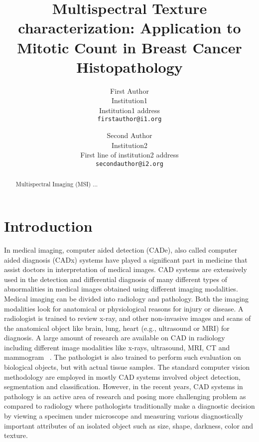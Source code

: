\documentclass[10pt,twocolumn,letterpaper]{article}
\begin{document}
\title{Multispectral Texture characterization: Application to Mitotic Count in Breast Cancer Histopathology}

\author{First Author\\
Institution1\\
Institution1 address\\
{\tt\small firstauthor@i1.org}
\and
Second Author\\
Institution2\\
First line of institution2 address\\
{\tt\small secondauthor@i2.org}
}

\maketitle

\begin{abstract}
Multispectral Imaging (MSI) ...
\end{abstract}

\section{Introduction}

In medical imaging, computer aided detection (CADe), also called computer aided diagnosis (CADx) systems have played a significant part in medicine that assist doctors in interpretation of medical images. CAD systems are extensively used in the detection and differential diagnosis of many different types of abnormalities in medical images obtained using different imaging modalities. Medical imaging can be divided into radiology and pathology. Both the imaging modalities look for anatomical or physiological reasons for injury or disease. A radiologist is trained to review x-ray, and other non-invasive images and scans of the anatomical object like brain, lung, heart (e.g., ultrasound or MRI) for diagnosis. A large amount of research are available on CAD in radiology including different image modalities like x-rays, ultrasound, MRI, CT and mammogram ~\cite{sonka2000,bankman2000,erickson2002,summers2003,giger2004}. The pathologist is also trained to perform such evaluation on biological objects, but with actual tissue samples. The standard computer vision methodology are employed in mostly CAD systems involved object detection, segmentation and classification. However, in the recent years, CAD systems in pathology is an active area of research and posing more challenging problem as compared to radiology where pathologists traditionally make a diagnostic decision by viewing a specimen under microscope and measuring various diagnostically important attributes of an isolated object such as size, shape, darkness, color and texture.
\end{document}
